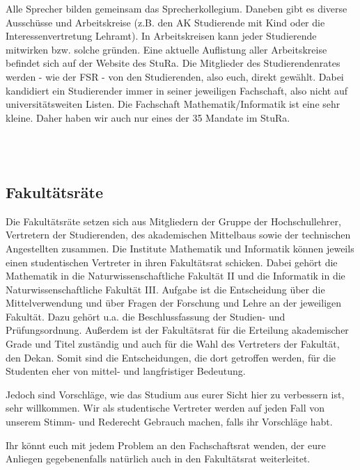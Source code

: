 Alle Sprecher bilden gemeinsam das Sprecherkollegium.
Daneben gibt es diverse Ausschüsse und Arbeitskreise (z.B. den AK Studierende mit Kind oder die Interessenvertretung Lehramt).
In Arbeitskreisen kann jeder Studierende mitwirken bzw. solche gründen.
Eine aktuelle Auflistung aller Arbeitskreise befindet sich auf der Website des StuRa.
Die Mitglieder des Studierendenrates werden - wie der FSR - von den Studierenden, also euch, direkt gewählt.
Dabei kandidiert ein Studierender immer in seiner jeweiligen Fachschaft, also nicht auf universitätsweiten Listen.
Die Fachschaft Mathematik/Informatik ist eine sehr kleine.
Daher haben wir auch nur eines der 35 Mandate im StuRa.


\\
\\

\subsection{Fakultätsräte}

Die Fakultätsräte setzen sich aus Mitgliedern der Gruppe der Hochschullehrer, Vertretern der Studierenden, des akademischen Mittelbaus sowie der technischen Angestellten zusammen.
Die Institute Mathematik und Informatik können jeweils einen studentischen Vertreter in ihren Fakultätsrat schicken.
Dabei gehört die Mathematik in die Naturwissenschaftliche Fakultät II und die Informatik in die Naturwissenschaftliche Fakultät III.
Aufgabe ist die Entscheidung über die Mittelverwendung und über Fragen der Forschung und Lehre an der jeweiligen Fakultät.
Dazu gehört u.a. die Beschlussfassung der Studien- und Prüfungsordnung.
Außerdem ist der Fakultätsrat für die Erteilung akademischer Grade und Titel zuständig und auch für die Wahl des Vertreters der Fakultät, den Dekan.
Somit sind die Entscheidungen, die dort getroffen werden, für die Studenten eher von mittel- und langfristiger Bedeutung.

Jedoch sind Vorschläge, wie das Studium aus eurer Sicht hier zu verbessern ist, sehr willkommen.
Wir als studentische Vertreter werden auf jeden Fall von unserem Stimm- und Rederecht Gebrauch machen, falls ihr Vorschläge habt.

Ihr könnt euch mit jedem Problem an den Fachschaftsrat wenden, der eure Anliegen gegebenenfalls natürlich auch in den Fakultätsrat weiterleitet.

\\
\\


